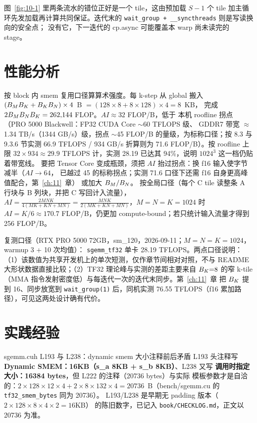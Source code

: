 图~\ref{fig:10-1} 里两条流水的错位正好是一个 tile，这由预加载 $S-1$ 个 tile
加主循环先发加载再计算共同保证。迭代末的
\texttt{wait\_\allowbreak{}group + \_\allowbreak{}\_\allowbreak{}syncthreads} 则是写读换向的安全点；
没有它，下一迭代的 cp.async 可能覆盖本 warp 尚未读完的 stage。

\section{性能分析}

按 block 内 smem 复用口径算算术强度。每 k-step 从 global 搬入
$(B\sb M B\sb K + B\sb K B\sb N)\times4$~B $= (128{\times}8{+}8{\times}128)\times4 = 8$~KB，
完成 $2 B\sb M B\sb N B\sb K = 262{,}144$ FLOP。$AI \approx 32$ FLOP/B，低于
本机 roofline 拐点（PRO 5000 Blackwell：FP32 CUDA Core $\sim$60 TFLOPS 级、
GDDR7 带宽 $\approx$1.34 TB/s（1344 GB/s）级，拐点 $\sim$45 FLOP/B 的量级，为标称口径；按
8.3 与 9.3.6 节实测 66.9 TFLOPS / 934 GB/s 折算则为 71.6 FLOP/B）。按 roofline 上限
$32\times934 \approx 29.9$ TFLOPS 计，实测 28.19 已达其 94\%，说明 $1024^3$ 这一档仍贴着带宽线。
要把 Tensor Core 变成瓶颈，须把 $AI$ 抬过拐点：换 f16 输入使字节减半（$AI \to 64$，
已越过 45 的标称拐点；实测 71.6 口径下还需 f16 自身更高峰值配合，第~\ref{ch:11}~章）
或加大 $B\sb M/B\sb N$。
按全局口径（每个 C tile 读整条 A 行块与 B 列块，并把 C 写回计入流量），
$AI = \frac{2MNK}{4(MK+KN+MN)} = \frac{MNK}{2(MK+KN+MN)}$，$M{=}N{=}K{=}1024$ 时
$AI=K/6\approx170.7$ FLOP/B，仍更加 compute-bound；若只统计输入流量才得到 256 FLOP/B。

复测口径（RTX PRO 5000 72GB，sm\_120，2026-09-11；$M{=}N{=}K{=}1024$，
warmup 3 + 10 次均值）：
\texttt{sgemm\_tf32} 单卡 28.19 TFLOPS。两点口径说明：
（1）该数值为共享开发机上的单次短测，仅作章节间相对对照，不与 README
大形状数据直接比较；（2）TF32 理论峰与实测的差距主要来自 $B\sb K{=}8$ 的窄
k-tile（MMA 指令发射密度低）与每迭代一次的迭代末同步。第~\ref{ch:11}~章
把 $B\sb K$ 提到 16、同步放宽到 \texttt{wait\_\allowbreak{}group\allowbreak{}(1)} 后，同机实测
76.55 TFLOPS（f16 累加路径），可见这两处设计确有代价。

\section{实践经验}

\begin{kaogu}[F4]{sgemm.cuh L193 与 L238：dynamic smem 大小注释前后矛盾}
  L193 头注释写\textbf{Dynamic SMEM：16KB（s\_a 8KB + s\_b 8KB）}、L238 又写
  \textbf{调用时指定大小：16384 bytes}，但 L222 的注释（20736 bytes）与实际
  模板参数才是自洽的：$2\times128\times12\times4 + 2\times8\times132\times4
  = 20736$~B（bench/sgemm.cu 的 \texttt{tf32\_\allowbreak{}smem\_\allowbreak{}bytes} 同为 20736）。
  L193/L238 是早期无 padding 版本（$2\times128\times8\times4\times2=16$KB）
  的陈旧数字，已记入 \texttt{book/\allowbreak{}CHECKLOG.\allowbreak{}md}，正文以 20736 为准。
\end{kaogu}

